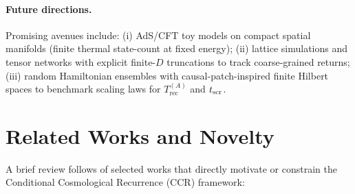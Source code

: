 \documentclass[12pt]{article}
\newcommand{\Trec}{T_{\text{rec}}}
\theoremstyle{remark}
\begin{document}
\paragraph{Future directions.}
Promising avenues include: (i) AdS/CFT toy models on compact spatial manifolds 
(finite thermal state-count at fixed energy); (ii) lattice simulations and tensor networks with 
explicit finite-$D$ truncations to track coarse-grained returns; (iii) random Hamiltonian 
ensembles with causal-patch-inspired finite Hilbert spaces to benchmark scaling laws for 
$\Trec^{(A)}$ and $t_{\rm scr}$.


\section{Related Works and Novelty}
A brief review follows of selected works that directly motivate or constrain the Conditional Cosmological Recurrence (CCR) framework:
\end{document}
